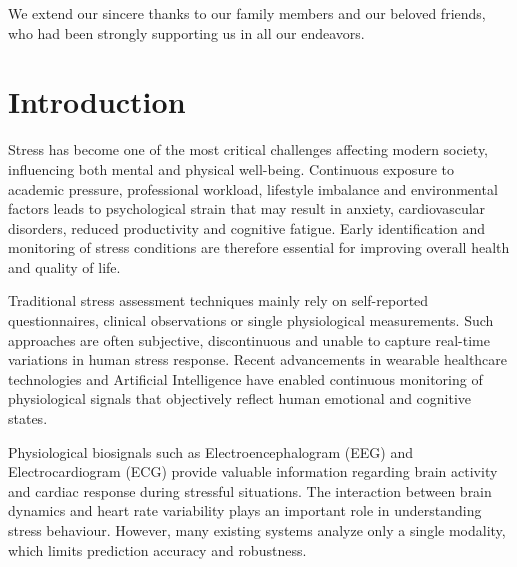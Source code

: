 \documentclass[12pt,a4paper]{report}
\begin{document}
We extend our sincere thanks to our family members and our beloved friends, who had been strongly supporting us in all our endeavors.

\setlength{\parindent}{0pt}
\setlength{\parskip}{6pt}
\onehalfspacing


\clearpage

\begingroup
{}
\setlength{\parskip}{0pt}

\pagestyle{mainstyle}
\thispagestyle{mainstyle}

\renewcommand{\contentsname}{CONTENTS}
\tableofcontents

\endgroup

\clearpage

\hypersetup{pageanchor=true}


\setcounter{page}{1}
\pagestyle{mainstyle}


\chapter{Introduction}

Stress has become one of the most critical challenges affecting modern society, influencing both mental and physical well-being. Continuous exposure to academic pressure, professional workload, lifestyle imbalance and environmental factors leads to psychological strain that may result in anxiety, cardiovascular disorders, reduced productivity and cognitive fatigue. Early identification and monitoring of stress conditions are therefore essential for improving overall health and quality of life.

Traditional stress assessment techniques mainly rely on self-reported questionnaires, clinical observations or single physiological measurements. Such approaches are often subjective, discontinuous and unable to capture real-time variations in human stress response. Recent advancements in wearable healthcare technologies and Artificial Intelligence have enabled continuous monitoring of physiological signals that objectively reflect human emotional and cognitive states.

Physiological biosignals such as Electroencephalogram (EEG) and Electrocardiogram (ECG) provide valuable information regarding brain activity and cardiac response during stressful situations. The interaction between brain dynamics and heart rate variability plays an important role in understanding stress behaviour. However, many existing systems analyze only a single modality, which limits prediction accuracy and robustness.
\end{document}

